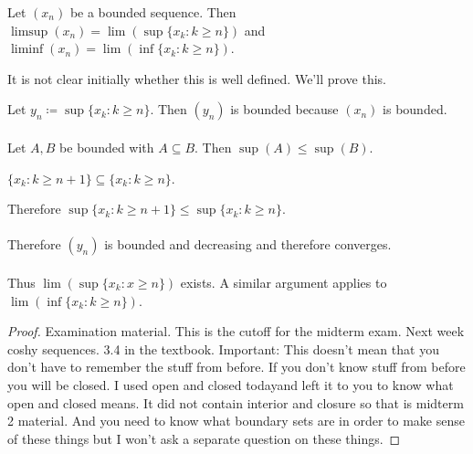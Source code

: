 \documentclass[class=scrartcl, crop=false]{standalone}
\begin{document}
\begin{theorem}
  Let $(x_n)$ be a bounded sequence. Then $\limsup(x_n) = \lim(\sup\{x_k : k \geq n \})$ and $\liminf(x_n) = \lim(\inf\{x_k: k \geq n\})$.
  \begin{remark}
    It is not clear initially whether this is well defined. We'll prove this.
  \end{remark} \noindent
  Let $y_n \coloneqq \sup\{x_k: k \geq n\}$. Then $(y_n)$ is bounded because $(x_n)$ is bounded.
  \\\\
  Let $A, B$ be bounded with $A \subseteq B$. Then $\sup(A) \leq \sup(B)$.
   \begin{note}
     $\{x_k: k \geq n + 1 \} \subseteq \{x_k : k \geq n\}$.
  \end{note} \noindent
  Therefore $\sup\{x_k: k \geq n + 1\} \leq \sup\{x_k: k \geq n\}$.
  \\\\
  Therefore $(y_n)$ is bounded and decreasing and therefore converges. 
  \\\\
  Thus $\lim(\sup\{x_k : x \geq n\})$ exists. A similar argument applies to $\lim(\inf\{x_k: k \geq n\})$.
  \begin{proof}
    Examination material. This is the cutoff for the midterm exam. Next week coshy sequences. 3.4 in the textbook. Important: This doesn't mean that you don't have to remember the stuff from before. If you don't know stuff from before you will be closed. I used open and closed todayand left it to you to know what open and closed means. It did not contain interior and closure so that is midterm 2 material. And you need to know what boundary sets are in order to make sense of these things but I won't ask a separate question on these things.
  \end{proof}
\end{theorem}
\end{document}

